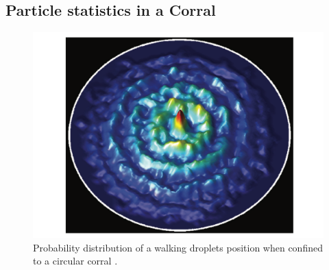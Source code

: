\documentclass[11pt,twocolumn]{article}
\begin{document}

\subsection{Particle statistics in a Corral}
\label{sec:particlestatisticsinacorral}
\begin{figure}[h]
	\includegraphics[width=\columnwidth]{WalkerCorral.pdf}
	\caption{Probability distribution of a walking droplets position when confined to a circular corral \cite{12}.}
	\label{fig:walkercorral}
\end{figure}
\end{document}
